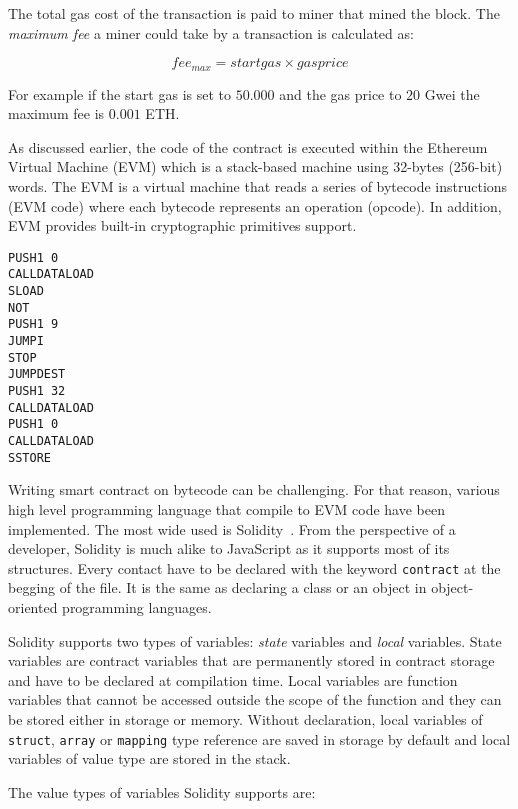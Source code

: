 The total gas cost of the transaction is paid to miner that mined the block. The \textit{maximum fee} a miner could take by a transaction is calculated as:

\begin{equation*}
  fee_{max} = startgas \times gasprice
\end{equation*}

For example if the start gas is set to $50.000$ and the gas price to $20$ Gwei the maximum fee is $0.001$ ETH.

As discussed earlier, the code of the contract is executed within the Ethereum Virtual Machine (EVM) which is a stack-based machine using 32-bytes (256-bit) words. The EVM is a virtual machine that reads a series of bytecode instructions (EVM code) where each bytecode represents an operation (opcode). In addition, EVM provides built-in cryptographic primitives support.

\begin{lstlisting}[language=Solidity, caption={EVM bytecode}]
PUSH1 0
CALLDATALOAD
SLOAD
NOT
PUSH1 9
JUMPI
STOP
JUMPDEST
PUSH1 32
CALLDATALOAD
PUSH1 0
CALLDATALOAD
SSTORE
\end{lstlisting}

Writing smart contract on bytecode can be challenging. For that reason, various high level programming language that compile to EVM code have been implemented. The most wide used is Solidity~\cite{solidity}. From the perspective of a developer, Solidity is much alike to JavaScript as it supports most of its structures. Every contact have to be declared with the keyword \verb|contract| at the begging of the file. It is the same as declaring a class or an object in object-oriented programming languages.

Solidity supports two types of variables: \textit{state} variables and \textit{local} variables. State variables are contract variables that are permanently stored in contract storage and have to be declared at compilation time. Local variables are function variables that cannot be accessed outside the scope of the function and they can be stored either in storage or memory. Without declaration, local variables of \verb|struct|, \verb|array| or \verb|mapping| type reference are saved in storage by default and local variables of value type are stored in the stack.

The value types of variables Solidity supports are:

